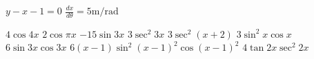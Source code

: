 \begin{Answer}[ref={exStandardDerivatives}]
\Question %
$y -x -1 =0$ 
\Question %
$\frac{d x}{d \theta } =5 \mathrm{m}/\mbox{rad}$

\Question %
\begin{tasks}
	\task $4 \cos  4 x$
	\task $2 \cos  \pi  x$ 
	\task $ -15 \sin  3 x$ 
	\task $3 \sec ^{2} 3 x$ 
	\task $3 \sec ^{2} \left (x +2\right )$ 
	\task $3 \sin ^{2} x \cos  x$ 
	\task $6 \sin  3 x \cos  3 x$ 
	\task $6 \left (x -1\right ) \sin ^{2} \left (x -1\right )^{2} \cos  \left (x -1\right )^{2}$ 
	\task $4 \tan  2 x \sec ^{2} 2 x$
\end{tasks}	
\end{Answer}%

